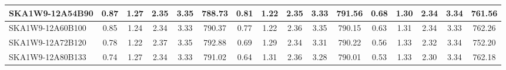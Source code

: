 \begin{table}[H]
{{\begin{tabular}{|lccccc||ccccc||ccccc|}
SKA1W9-12A54B90 & 0.87 \cellcolor{blue!60.00} & 1.27 \cellcolor{red!35.33} & 2.35 \cellcolor{green!39.77} & 3.35 \cellcolor{orange!38.66} & 788.73 \cellcolor{purple!18.00} & 0.81 \cellcolor{blue!60.00} & 1.22 \cellcolor{red!18.00} & 2.35 \cellcolor{green!31.94} & 3.33 \cellcolor{orange!45.90} & 791.56 \cellcolor{purple!60.00} & 0.68 \cellcolor{blue!60.00} & 1.30 \cellcolor{red!18.00} & 2.34 \cellcolor{green!52.65} & 3.34 \cellcolor{orange!35.52} & 761.56 \cellcolor{purple!57.08}\\ \hline 
SKA1W9-12A60B100 & 0.85 \cellcolor{blue!55.61} & 1.24 \cellcolor{red!22.48} & 2.34 \cellcolor{green!18.00} & 3.33 \cellcolor{orange!19.79} & 790.37 \cellcolor{purple!26.07} & 0.77 \cellcolor{blue!52.36} & 1.22 \cellcolor{red!19.91} & 2.36 \cellcolor{green!60.00} & 3.35 \cellcolor{orange!60.00} & 790.15 \cellcolor{purple!21.74} & 0.63 \cellcolor{blue!46.41} & 1.31 \cellcolor{red!34.37} & 2.34 \cellcolor{green!53.14} & 3.33 \cellcolor{orange!18.00} & 762.26 \cellcolor{purple!60.00}\\ \hline 
SKA1W9-12A72B120 & 0.78 \cellcolor{blue!43.43} & 1.22 \cellcolor{red!18.00} & 2.37 \cellcolor{green!60.00} & 3.35 \cellcolor{orange!39.11} & 792.88 \cellcolor{purple!38.36} & 0.69 \cellcolor{blue!37.03} & 1.29 \cellcolor{red!44.74} & 2.34 \cellcolor{green!18.00} & 3.31 \cellcolor{orange!34.88} & 790.22 \cellcolor{purple!23.64} & 0.56 \cellcolor{blue!25.14} & 1.33 \cellcolor{red!60.00} & 2.32 \cellcolor{green!32.54} & 3.34 \cellcolor{orange!45.26} & 752.20 \cellcolor{purple!18.00}\\ \hline 
SKA1W9-12A80B133 & 0.74 \cellcolor{blue!35.36} & 1.27 \cellcolor{red!33.64} & 2.34 \cellcolor{green!28.37} & 3.33 \cellcolor{orange!18.00} & 791.02 \cellcolor{purple!29.27} & 0.64 \cellcolor{blue!26.86} & 1.31 \cellcolor{red!53.84} & 2.36 \cellcolor{green!52.78} & 3.28 \cellcolor{orange!18.00} & 790.01 \cellcolor{purple!18.00} & 0.53 \cellcolor{blue!18.00} & 1.33 \cellcolor{red!51.03} & 2.30 \cellcolor{green!18.00} & 3.34 \cellcolor{orange!41.64} & 762.18 \cellcolor{purple!59.66}\\ \hline 
\end{tabular}}
\vspace{-0.300000cm}
\hspace{1cm} 
}
\end{table}
